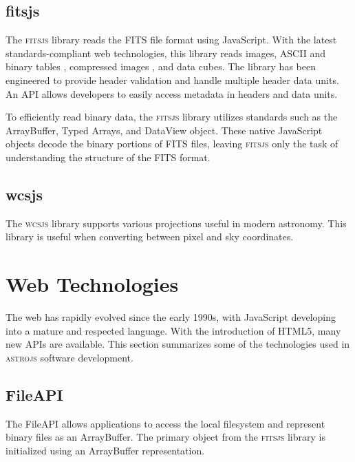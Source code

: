 \subsection{fitsjs}

The \textsc{fitsjs} library reads the FITS file format \citep{2010A&A...524A..42P} using JavaScript.  With the latest standards-compliant web technologies, this library reads images, ASCII and binary tables \citep{1995A&AS..113..159C}, compressed images \citep{2012arXiv1201.1336W}, and data cubes.  The library has been engineered to provide header validation and handle multiple header data units.  An API allows developers to easily access metadata in headers and data units.

To efficiently read binary data, the \textsc{fitsjs} library utilizes standards such as the ArrayBuffer, Typed Arrays, and DataView object.  These native JavaScript objects decode the binary portions of FITS files, leaving \textsc{fitsjs} only the task of understanding the structure of the FITS format.

\subsection{wcsjs}

The \textsc{wcsjs} library supports various projections \citep{2002A&A...395.1077C} useful in modern astronomy.  This library is useful when converting between pixel and sky coordinates.

\section{Web Technologies}

The web has rapidly evolved since the early 1990s, with JavaScript developing into a mature and respected language.  With the introduction of HTML5, many new APIs are available.  This section summarizes some of the technologies used in \textsc{astrojs} software development.

\subsection{FileAPI}

The FileAPI \citep{W3CFileAPI} allows applications to access the local filesystem and represent binary files as an ArrayBuffer.  The primary object from the \textsc{fitsjs} library is initialized using an ArrayBuffer representation.


